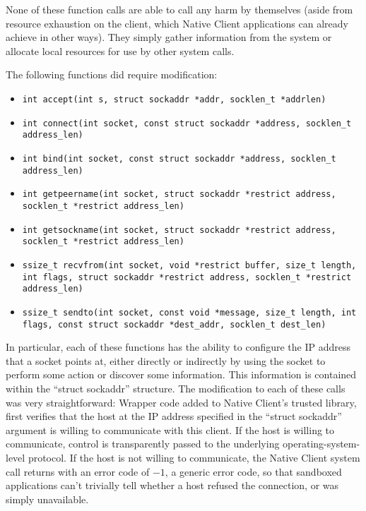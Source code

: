 \documentclass[a4paper,10pt]{article}
\begin{document}
None of these function calls are able to call any harm by themselves (aside
from resource exhaustion on the client, which Native Client applications can
already achieve in other ways).  They simply gather information from the system
or allocate local resources for use by other system calls.

The following functions did require modification:

\begin{itemize}
\item \texttt{int accept(int s, struct sockaddr *addr, socklen\_t *addrlen)}
\item \texttt{int connect(int socket, const struct sockaddr *address,
       socklen\_t address\_len)}
\item \texttt{int bind(int socket, const struct sockaddr *address,
       socklen\_t address\_len)}

\item \texttt{int getpeername(int socket, struct sockaddr *restrict address,
       socklen\_t *restrict address\_len)}
\item \texttt{int getsockname(int socket, struct sockaddr *restrict address,
       socklen\_t *restrict address\_len)}

\item \texttt{ssize\_t recvfrom(int socket, void *restrict buffer, size\_t
length,
       int flags, struct sockaddr *restrict address,
       socklen\_t *restrict address\_len)}
\item \texttt{ssize\_t sendto(int socket, const void *message, size\_t length,
       int flags, const struct sockaddr *dest\_addr,
       socklen\_t dest\_len)}
\end{itemize}

In particular, each of these functions has the ability to configure the IP
address that a socket points at, either directly or indirectly by using
the socket to perform some action or discover some information.  This
information is contained within the ``struct sockaddr'' structure.  The
modification to each of these calls was very straightforward: Wrapper code added
to Native Client's trusted library, first verifies that the host at the
IP address specified in the ``struct sockaddr'' argument is willing to
communicate with this client.  If the host is willing to communicate, control
is transparently passed to the underlying operating-system-level protocol.  If
the host is not willing to communicate, the Native Client system call returns
with an error code of $-1$, a generic error code, so that sandboxed
applications can't trivially tell whether a host refused the connection, or was
simply unavailable.
\end{document}
